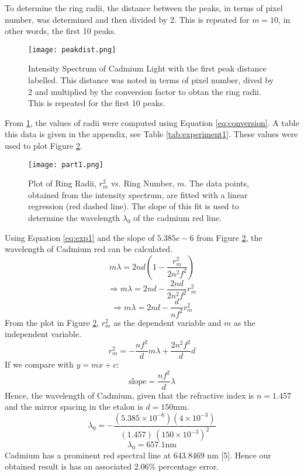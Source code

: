 \documentclass[11pt,twocolumn, a4paper]{article}
\numberwithin{equation}{section} %
\numberwithin{figure}{section} %
\numberwithin{table}{section} %
\begin{document}
To determine the ring radii, the distance between the peaks, in terms of pixel number, was determined and then divided by 2. This is repeated for \(m=10\), in other words, the first 10 peaks.  

\begin{figure}[H]
    \centering
    \texttt{[image: peakdist.png]}
    \caption{Intensity Spectrum of Cadmium Light with the first peak distance labelled. This distance was noted in terms of pixel number, dived by 2 and multiplied by the conversion factor to obtan the ring radii. This is repeated for the first 10 peaks.}
    \label{fig:peakdist}
\end{figure}

From \ref{fig:peakdist}, the values of radii were computed using Equation \ref{eq:conversion}. A table this data is given in the appendix, see Table \ref{tab:experiment1}. These values were used to plot Figure \ref{fig:mvr}. 

\begin{figure}[H]
    \centering
    \texttt{[image: part1.png]}
    \caption{Plot of Ring Radii, \(r_m^2\) vs. Ring Number, \(m\). The data points, obtained from the intensity spectrum, are fitted with a linear regression (red dashed line). The slope of this fit is used to determine the wavelength \(\lambda_0\) of the cadmium red line.}
    \label{fig:mvr}
\end{figure}
Using Equation \ref{eq:exp1} and the slope of \(5.385e-6\) from Figure \ref{fig:mvr}, the wavelength of Cadmium red can be calculated. 
\[
m \lambda = 2 n d \left(1 - \frac{r_m^2}{2 n^2 f^2}\right)
\]
\[
\Rightarrow m\lambda = 2nd - \frac{2nd}{2n^2f^2}r_m^2
\]
\[
\Rightarrow m\lambda = 2nd - \frac{d}{nf^2}r_m^2
\]
From the plot in Figure \ref{fig:mvr}, \(r_m^2\) as the dependent variable and $m$ as the independent variable. 
\[
r_m^2 = -\frac{nf^2}{d}m\lambda + \frac{2n^2f^2}{d}d
\]
If we compare with \(y = mx + c\):
\[
\text{slope} = \frac{nf^2}{d}\lambda
\]
Hence, the wavelength of Cadmium, given that the refractive index is \(n = 1.457 \) and the mirror spacing in the etalon is \(d = 150\)mm. 
\[
\lambda_0 = -\frac{(5.385 \times 10^{-6})(4 \times 10^{-3})}{(1.457) \, (150 \times 10^{-3})^2}
\]
\[
\lambda_0 = 657.1 \text{nm}
\]
Cadmium has a prominent red spectral line at 643.8469 nm [5]. Hence our obtained result is has an associated 2.06\% percentage error. 
\end{document}
